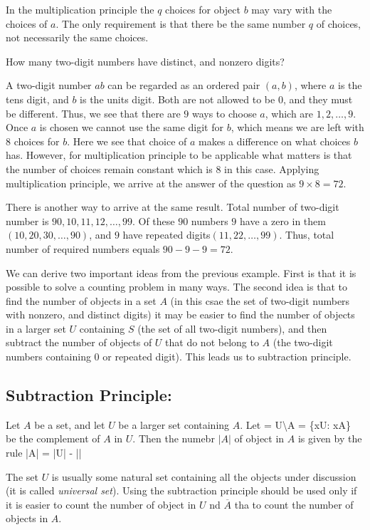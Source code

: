 In the multiplication principle the $q$ choices for object $b$ may vary with the choices of $a$. The only requirement is that there
be the same number $q$ of choices, not necessarily the same choices.

 How many two-digit numbers have distinct, and nonzero digits?

A two-digit number $ab$ can be regarded as an ordered pair $(a, b)$, where $a$ is the tens digit, and $b$ is the units digit. Both
are not allowed to be $0$, and they must be different. Thus, we see that there are $9$ ways to choose $a$, which are $1, 2, \ldots,
9$. Once $a$ is chosen we cannot use the same digit for $b$, which means we are left with $8$ choices for $b$. Here we see that
choice of $a$ makes a difference on what choices $b$ has. However, for multiplication principle to be applicable what matters is
that the number of choices remain constant which is $8$ in this case. Applying multiplication principle, we arrive at the answer of
the question as $9\times8 = 72$.

There is another way to arrive at the same result. Total number of two-digit number is $90, 10,11, 12, \ldots, 99$. Of these $90$
numbers $9$ have a zero in them$(10, 20, 30, \ldots, 90)$, and $9$ have repeated digits$(11, 22, \ldots, 99)$. Thus, total number of
required numbers equals $90 - 9 - 9 = 72$.

We can derive two important ideas from the previous example. First is that it is possible to solve a counting problem in many
ways. The second idea is that to find the number of objects in a set $A$ (in this csae the set of two-digit numbers with nonzero,
and distinct digits) it may be easier to find the number of objects in a larger set $U$ containing $S$ (the set of all
two-digit numbers), and then subtract the number of objects of $U$ that do not belong to $A$ (the two-digit numbers containing $0$
or repeated digit). This leads us to subtraction principle.

\subsection{Subtraction Principle:}
Let $A$ be a set, and let $U$ be a larger set containing $A$. Let
\startformula {} = U\textbackslash A = \{x\in U: x\notin A\}\stopformula
be the complement of $A$ in $U$. Then the numebr $|A|$ of object in $A$ is given by the rule
\startformula |A| = |U| - ||\stopformula

The set $U$ is usually some natural set containing all the objects under discussion (it is called {\it universal set}). Using
the subtraction principle should be used only if it is easier to count the number of object in $U$ nd $\overline{A}$ tha to count the
number of objects in $A$.

